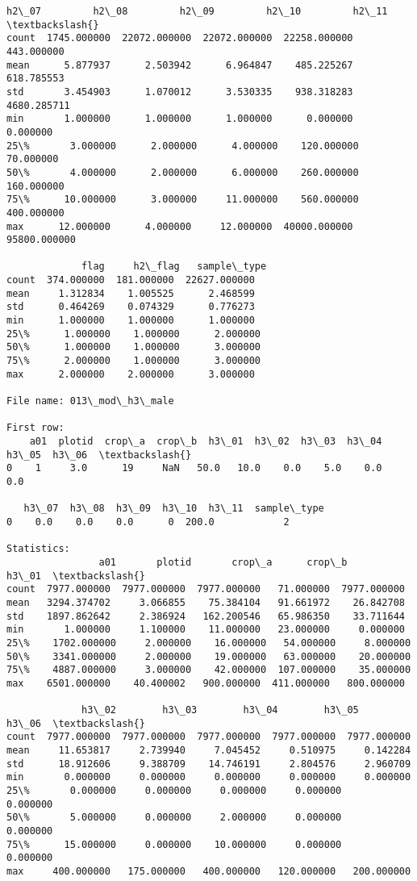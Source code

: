 \documentclass[11pt]{article}
\begin{document}
\begin{Verbatim}[commandchars=\\\{\}]
             h2\_07         h2\_08         h2\_09         h2\_10         h2\_11  \textbackslash{}
count  1745.000000  22072.000000  22072.000000  22258.000000    443.000000   
mean      5.877937      2.503942      6.964847    485.225267    618.785553   
std       3.454903      1.070012      3.530335    938.318283   4680.285711   
min       1.000000      1.000000      1.000000      0.000000      0.000000   
25\%       3.000000      2.000000      4.000000    120.000000     70.000000   
50\%       4.000000      2.000000      6.000000    260.000000    160.000000   
75\%      10.000000      3.000000     11.000000    560.000000    400.000000   
max      12.000000      4.000000     12.000000  40000.000000  95800.000000   

             flag     h2\_flag   sample\_type  
count  374.000000  181.000000  22627.000000  
mean     1.312834    1.005525      2.468599  
std      0.464269    0.074329      0.776273  
min      1.000000    1.000000      1.000000  
25\%      1.000000    1.000000      2.000000  
50\%      1.000000    1.000000      3.000000  
75\%      2.000000    1.000000      3.000000  
max      2.000000    2.000000      3.000000  

File name: 013\_mod\_h3\_male

First row: 
    a01  plotid  crop\_a  crop\_b  h3\_01  h3\_02  h3\_03  h3\_04  h3\_05  h3\_06  \textbackslash{}
0    1     3.0      19     NaN   50.0   10.0    0.0    5.0    0.0    0.0   

   h3\_07  h3\_08  h3\_09  h3\_10  h3\_11  sample\_type  
0    0.0    0.0    0.0      0  200.0            2  

Statistics: 
                a01       plotid       crop\_a      crop\_b        h3\_01  \textbackslash{}
count  7977.000000  7977.000000  7977.000000   71.000000  7977.000000   
mean   3294.374702     3.066855    75.384104   91.661972    26.842708   
std    1897.862642     2.386924   162.200546   65.986350    33.711644   
min       1.000000     1.100000    11.000000   23.000000     0.000000   
25\%    1702.000000     2.000000    16.000000   54.000000     8.000000   
50\%    3341.000000     2.000000    19.000000   63.000000    20.000000   
75\%    4887.000000     3.000000    42.000000  107.000000    35.000000   
max    6501.000000    40.400002   900.000000  411.000000   800.000000   

             h3\_02        h3\_03        h3\_04        h3\_05        h3\_06  \textbackslash{}
count  7977.000000  7977.000000  7977.000000  7977.000000  7977.000000   
mean     11.653817     2.739940     7.045452     0.510975     0.142284   
std      18.912606     9.388709    14.746191     2.804576     2.960709   
min       0.000000     0.000000     0.000000     0.000000     0.000000   
25\%       0.000000     0.000000     0.000000     0.000000     0.000000   
50\%       5.000000     0.000000     2.000000     0.000000     0.000000   
75\%      15.000000     0.000000    10.000000     0.000000     0.000000   
max     400.000000   175.000000   400.000000   120.000000   200.000000   


\end{Verbatim}
\end{document}
